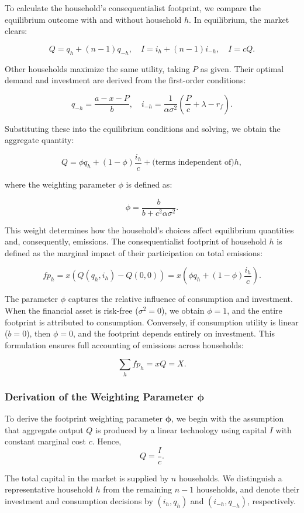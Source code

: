 \documentclass[12pt,a4paper]{article}%
\begin{document}
To calculate the household's consequentialist footprint, we compare the equilibrium outcome with and without household $h$. In equilibrium, the market clears:

\[
Q = q_h + (n - 1) q_{-h}, \quad I = i_h + (n - 1) i_{-h}, \quad I = cQ.
\]

Other households maximize the same utility, taking $P$ as given. Their optimal demand and investment are derived from the first-order conditions:

\[
q_{-h} = \frac{a - x - P}{b}, \quad i_{-h} = \frac{1}{\alpha \sigma^2} \left( \frac{P}{c} + \lambda - r_f \right).
\]

Substituting these into the equilibrium conditions and solving, we obtain the aggregate quantity:

\[
Q = \phi q_h + (1 - \phi) \frac{i_h}{c} + \text{(terms independent of)} h,
\]

where the weighting parameter $\phi$ is defined as:

\[
\phi = \frac{b}{b + c^2 \alpha \sigma^2}.
\]

This weight determines how the household’s choices affect equilibrium quantities and, consequently, emissions. The consequentialist footprint of household $h$ is defined as the marginal impact of their participation on total emissions:

\[
fp_h = x \left( Q(q_h, i_h) - Q(0, 0) \right) = x \left( \phi q_h + (1 - \phi) \frac{i_h}{c} \right).
\]


The parameter $\phi$ captures the relative influence of consumption and investment. When the financial asset is risk-free ($\sigma^2 = 0$), we obtain $\phi = 1$, and the entire footprint is attributed to consumption. Conversely, if consumption utility is linear ($b = 0$), then $\phi = 0$, and the footprint depends entirely on investment. This formulation ensures full accounting of emissions across households:

\[
\sum_h fp_h = xQ = X.
\]
\subsubsection{Derivation of the Weighting Parameter \( \boldsymbol{\phi} \)}

To derive the footprint weighting parameter \( \boldsymbol{\phi} \), we begin with the assumption that aggregate output \( Q \) is produced by a linear technology using capital \( I \) with constant marginal cost \( c \). Hence,
\[
Q = \frac{I}{c}.
\]

The total capital in the market is supplied by \( n \) households. We distinguish a representative household \( h \) from the remaining \( n - 1 \) households, and denote their investment and consumption decisions by \( (i_h, q_h) \) and \( (i_{-h}, q_{-h}) \), respectively.
\end{document}
